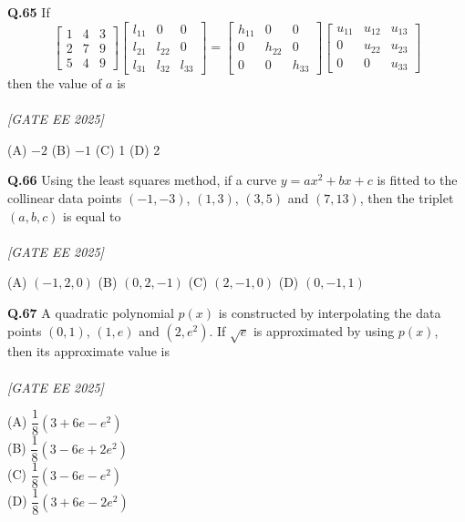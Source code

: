 \documentclass[11pt]{article}
\begin{document}
\begin{flushleft}
\textbf{Q.65} If 
\[
\begin{bmatrix}
1 & 4 & 3 \\
2 & 7 & 9 \\
5 & 4 & 9
\end{bmatrix}
\begin{bmatrix}
l_{11} & 0 & 0 \\
l_{21} & l_{22} & 0 \\
l_{31} & l_{32} & l_{33}
\end{bmatrix}
= 
\begin{bmatrix}
h_{11} & 0 & 0 \\
0 & h_{22} & 0 \\
0 & 0 & h_{33}
\end{bmatrix}
\begin{bmatrix}
u_{11} & u_{12} & u_{13} \\
0 & u_{22} & u_{23} \\
0 & 0 & u_{33}
\end{bmatrix}
\]
then the value of $a$ is \\
\\[1ex] \textit{[GATE EE 2025]}

(A) $-2$ \hspace{2em} (B) $-1$ \hspace{2em} (C) 1 \hspace{2em} (D) 2
\end{flushleft}

\begin{flushleft}
\textbf{Q.66} Using the least squares method, if a curve $y = ax^2 + bx + c$ is fitted to the collinear data points $(-1, -3)$, $(1, 3)$, $(3, 5)$ and $(7, 13)$, then the triplet $(a, b, c)$ is equal to \\
\\[1ex] \textit{[GATE EE 2025]}

(A) $(-1, 2, 0)$ \hspace{2em} (B) $(0, 2, -1)$ \hspace{2em} (C) $(2, -1, 0)$ \hspace{2em} (D) $(0, -1, 1)$
\end{flushleft}

\begin{flushleft}
\textbf{Q.67} A quadratic polynomial $p(x)$ is constructed by interpolating the data points $(0,1)$, $(1,e)$ and $(2,e^2)$. If $\sqrt{e}$ is approximated by using $p(x)$, then its approximate value is \\
\\[1ex] \textit{[GATE EE 2025]}


(A) $\dfrac{1}{8} \left( 3 + 6e - e^2 \right)$ \\
(B) $\dfrac{1}{8} \left( 3 - 6e + 2e^2 \right)$ \\
(C) $\dfrac{1}{8} \left( 3 - 6e - e^2 \right)$ \\
(D) $\dfrac{1}{8} \left( 3 + 6e - 2e^2 \right)$
\end{flushleft}
\end{document}
